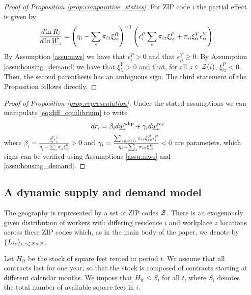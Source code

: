 \begin{proof}[Proof of Proposition \ref{prop:comparative_statics}]
    For ZIP code $i$ the partial effect is given by
    $$
    \frac{d\ln R_i}{d\ln\underline{W}_{i}} 
      = \left(\eta_i - \sum_z \pi_{iz} \xi^R_{iz}\right)^{-1} 
        \left(\epsilon_{i}^P \sum_z \pi_{iz}\xi^P_{iz} 
             + \pi_{ii}\xi^Y_{ii}\epsilon_{ii}^Y \right) .
    $$
    By Assumption \ref{assu:mws} we have that $\epsilon_{i}^P>0$ and that 
    $\epsilon_{ii}^Y\geq0$.
    By Assumption \ref{assu:housing_demand} we have that $\xi^Y_{ii}>0$ and that, 
    for all $z\in\mathcal{Z}(i)$, $\xi^P_{iz}<0$.
    Then, the second parenthesis has an ambiguous sign.
    The third statement of the Proposition follows directly.
\end{proof}

\begin{proof}[Proof of Proposition \ref{prop:representation}]
    Under the stated assumptions we can manipulate \eqref{eq:diff_equilibrium} 
    to write
    $$
    d r_{i} = \beta_i d \underline{w}_{i}^{\text{wkp}} + \gamma_i d \underline{w}^{\text{res}}_i
    $$
    where
    $\beta_i = \frac{\xi_{i}^{Y}\epsilon_i^{Y}}
                     {\eta_{i} - \sum_z \pi_{iz} \xi_{iz}^R} 
              > 0$ and
    $\gamma_i = \frac{\sum_{z\in\mathcal{Z}(i)}\pi_{iz}\xi_{iz}^{P}\epsilon_{i}^{P}}
                    {\eta_{i} - \sum_z \pi_{iz} \xi_{iz}^R} 
              < 0$
    are parameters, which signs can be verified using
    Assumptions \ref{assu:mws} and \ref{assu:housing_demand}.
\end{proof}

\subsection{A dynamic supply and demand model}\label{sec:dyn_theory_model}

The geography is represented by a set of ZIP codes $\mathcal{Z}$.
There is an exogenously given distribution of workers with differing 
residence $i$ and workplace $z$ locations across these ZIP codes which,
as in the main body of the paper, we denote by $\{L_{iz}\}_{i,z\in\mathcal{Z}\times\mathcal{Z}}$.

Let $H_{it}$ be the stock of square feet rented in period $t$.
We assume that all contracts last for one year, so that
the stock is composed of contracts starting at different calendar months. 
We impose that $H_{it} \leq S_i$ for all $t$, 
where $S_i$ denotes the total number of available square feet in $i$.

